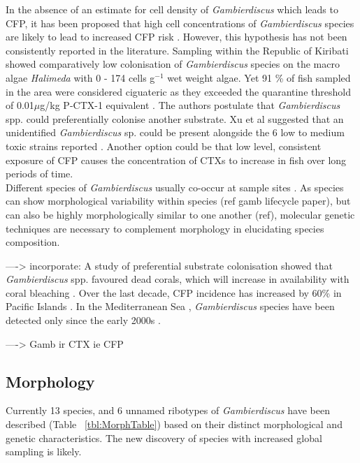 \documentclass[12pt]{article}
\begin{document}
In the absence of an estimate for cell density of \emph{Gambierdiscus} which leads to CFP, it has been proposed  that high cell concentrations of \emph{Gambierdiscus} species are likely to lead to increased CFP risk \cite{litaker2010global}. 
However, this hypothesis has not been consistently reported in the literature. Sampling within the Republic of Kiribati showed comparatively low colonisation of \emph{Gambierdiscus} species on the macro algae \emph{Halimeda} with 0 - 174 cells g$^{-1}$ wet weight algae. Yet 91 \% of fish sampled in the area were considered ciguateric as they exceeded the quarantine threshold of 0.01$\mu$g/kg P-CTX-1 equivalent \cite{xu2014distribution,chan2011spatial}. The authors postulate that \emph{Gambierdiscus} spp. could preferentially colonise another substrate. Xu et al suggested that an unidentified \emph{Gambierdiscus} sp. could be present alongside the 6 low to medium toxic strains reported \cite{xu2014distribution,bomber1988r}. Another option could be that low level, consistent exposure of CFP causes the concentration of CTXs to increase in fish over long periods of time.\\

Different species of \emph{Gambierdiscus} usually co-occur at sample sites \cite{litaker2010global}. As species can show morphological variability within species (ref gamb lifecycle paper), but can also be highly morphologically similar to one another (ref), molecular genetic techniques are necessary to complement morphology in elucidating species composition.

----> incorporate:  A study of preferential substrate colonisation showed that \emph{Gambierdiscus} spp. favoured dead corals, which will increase in availability with coral bleaching \cite{grzebyk1994ecology}. Over the last decade, CFP incidence has increased by 60\% in Pacific Islands \cite{skinner2011ciguatera}. In the Mediterranean Sea \cite{lejeusne2010climate}, \emph{Gambierdiscus} species have been detected only since the early 2000s \cite{aligizaki2008morphological}.

----> Gamb ir CTX ie CFP

\subsection{Morphology}

Currently 13 species, and 6 unnamed ribotypes of \emph{Gambierdiscus} have been described (Table ~\ref{tbl:MorphTable}) based on their distinct morphological and genetic characteristics. The new discovery of species with increased global sampling is likely. \\
\end{document}
